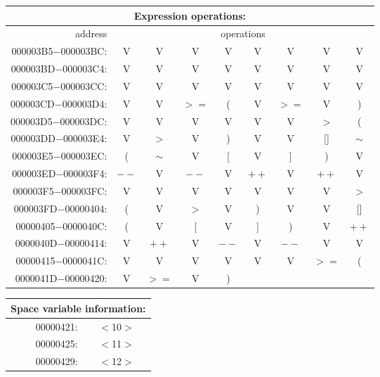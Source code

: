 \begin{center}\begin{tabular}{|r|c|c|c|c|c|c|c|c|}
\hline
\multicolumn{9}{|c|}{Expression operations:} \\
\hline
address & \multicolumn{8}{c|}{operations} \\
\hline\hline
000003B5$-$000003BC: & V    & V      & V    & V    & V    & V    & V    & V  \\
000003BD$-$000003C4: & V    & V      & V    & V    & V    & V    & V    & V  \\
000003C5$-$000003CC: & V    & V      & V    & V    & V    & V    & V    & V  \\
000003CD$-$000003D4: & V    & V      & $>=$ & (    & V    & $>=$ & V    & )  \\
000003D5$-$000003DC: & V    & V      & V    & V    & V    & V    & $>$  & (  \\
000003DD$-$000003E4: & V  & $>$  & V   & )    & V    & V    & []   & $\sim$ \\
000003E5$-$000003EC: & (    & $\sim$ & V    & [    & V    & ]    & )    & V  \\
000003ED$-$000003F4: & $--$ & V      & $--$ & V    & $++$ & V    & $++$ & V  \\
000003F5$-$000003FC: & V    & V   & V    & V    & V    & V    & V    & $>$  \\
000003FD$-$00000404: & (    & V    & $>$  & V    & )    & V    & V    & []  \\
00000405$-$0000040C: & (    & V    & [    & V    & ]    & )    & V    & $++$ \\
0000040D$-$00000414: & V    & $++$   & V    & $--$ & V    & $--$ & V    & V  \\
00000415$-$0000041C: & V    & V      & V    & V    & V    & V    & $>=$ & (  \\
0000041D$-$00000420: & V    & $>=$   & V    & )    &      &      &      &    \\
\hline
\end{tabular}\end{center}
\begin{center}\begin{tabular}{|r|c|}
\hline
\multicolumn{2}{|c|}{Space variable information:} \\
\hline
00000421: & $<$10$>$ \\
00000425: & $<$11$>$ \\
00000429: & $<$12$>$ \\
\hline
\end{tabular}\end{center}
